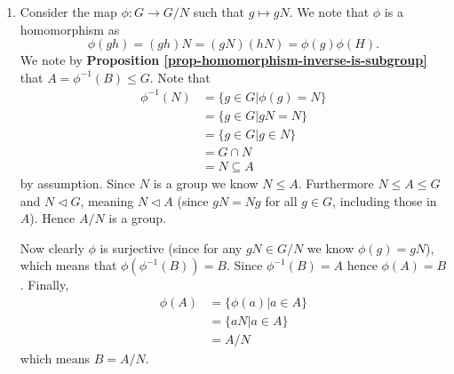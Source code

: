 \begin{enumerate}
    \item Consider the map $\phi: G \to G/N$ such that $g \mapsto gN$. We note that $\phi$ is a homomorphism as
    \[
        \phi(gh) = (gh)N = (gN)(hN) = \phi(g)\phi(H).
    \]
    We note by \textbf{Proposition \ref{prop-homomorphism-inverse-is-subgroup}} that $A = \phi^{-1}(B) \leq G$. Note that
    \begin{align*}
        \phi^{-1}(N) &= \{g \in G \vert \phi(g) = N\}\\
        &= \{g \in G \vert gN = N\}\\
        &= \{g \in G \vert g \in N\}\\
        &= G \cap N\\
        &= N \subseteq A
    \end{align*}
    by assumption. Since $N$ is a group we know $N \leq A$. Furthermore $N \leq A \leq G$ and $N \lhd G$, meaning $N \lhd A$ (since $gN = Ng$ for all $g \in G$, including those in $A$). Hence $A/N$ is a group.
    
    Now clearly $\phi$ is surjective (since for any $gN \in G/N$ we know $\phi(g) = gN$), which means that $\phi(\phi^{-1}(B)) = B$. Since $\phi^{-1}(B) = A$ hence $\phi(A) = B$. Finally,
    \begin{align*}
        \phi(A) &= \{\phi(a) \vert a \in A\}\\
        &= \{aN \vert a \in A\}\\
        &= A/N
    \end{align*}
    which means $B = A/N$.
\end{enumerate}

